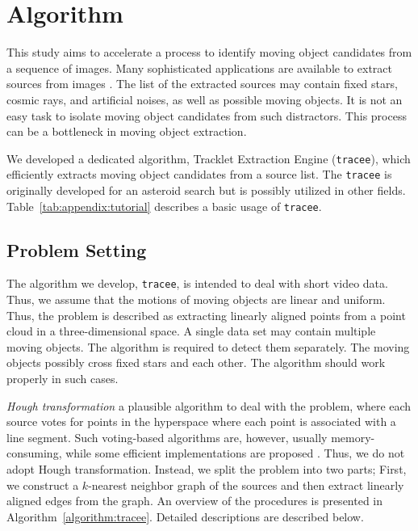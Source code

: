 
\section{Algorithm}
\label{sec:algorithm}

This study aims to accelerate a process to identify moving object candidates from a sequence of images. Many sophisticated applications are available to extract sources from images \citep[e.g., \texttt{DAOFIND} and \texttt{Source Extractor}; ][]{stetson_daophot_1987,bertin_sextractor:_1996}. The list of the extracted sources may contain fixed stars, cosmic rays, and artificial noises, as well as possible moving objects. It is not an easy task to isolate moving object candidates from such distractors. This process can be a bottleneck in moving object extraction.

We developed a dedicated algorithm, Tracklet Extraction Engine (\texttt{tracee}), which efficiently extracts moving object candidates from a source list. The \texttt{tracee} is originally developed for an asteroid search but is possibly utilized in other fields. Table~\ref{tab:appendix:tutorial} describes a basic usage of \texttt{tracee}.


\subsection{Problem Setting}
\label{sec:algorithm:problem}

The algorithm we develop, \texttt{tracee},  is intended to deal with short video data. Thus, we assume that the motions of moving objects are linear and uniform. Thus, the problem is described as extracting linearly aligned points from a point cloud in a three-dimensional space. A single data set may contain multiple moving objects. The algorithm is required to detect them separately. The moving objects possibly cross fixed stars and each other. The algorithm should work properly in such cases.

\textit{Hough transformation} \citep{hough_method_1962} a plausible algorithm to deal with the problem, where each source votes for points in the hyperspace where each point is associated with a line segment. Such voting-based algorithms are, however, usually memory-consuming, while some efficient implementations are proposed \citep{li_fast_1986}. Thus, we do not adopt Hough transformation. Instead, we split the problem into two parts; First, we construct a $k$-nearest neighbor graph of the sources and then extract linearly aligned edges from the graph. An overview of the procedures is presented in Algorithm~\ref{algorithm:tracee}. Detailed descriptions are described below.


